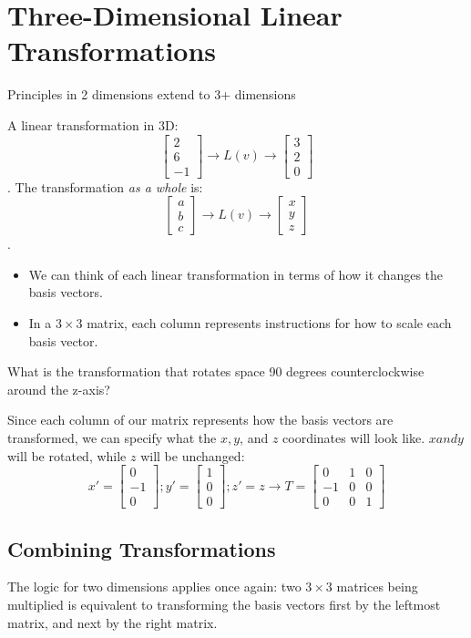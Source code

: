 \section{Three-Dimensional Linear Transformations}
Principles in 2 dimensions extend to 3+ dimensions
\begin{example}
    A linear transformation in 3D:
    $$ \begin{bmatrix}
    2 \\
    6 \\
    -1
    \end{bmatrix} \rightarrow
    L(v) \rightarrow
    \begin{bmatrix}
    3 \\
    2 \\
    0
    \end{bmatrix}$$.
    The transformation \textit{as a whole} is:
    $$ \begin{bmatrix}
        a \\
        b \\
        c
    \end{bmatrix} \rightarrow
    L(v) \rightarrow
    \begin{bmatrix}
        x \\
        y \\
        z
    \end{bmatrix}$$.
\end{example}
\begin{itemize}
    \item We can think of each linear transformation in terms of how it changes the basis vectors.
    \item In a $3 \times 3$ matrix, each column represents instructions for how to scale each basis vector.
\end{itemize}
\begin{example}
    What is the transformation that rotates space 90 degrees counterclockwise around the z-axis?

    Since each column of our matrix represents how the basis vectors are transformed, we can specify what the $x, y$, and $z$ coordinates will look like. $x and y$ will be rotated, while $z$ will be unchanged:
    $$ x' = \begin{bmatrix}
    0 \\
    -1 \\
    0 
    \end{bmatrix};
    y' = \begin{bmatrix}
    1 \\
    0 \\
    0
    \end{bmatrix}; 
    z' = z \rightarrow T = \begin{bmatrix}
    0 & 1 & 0 \\
    -1 & 0 & 0 \\
    0 & 0 & 1
    \end{bmatrix}$$
\end{example}

\subsection{Combining Transformations}
The logic for two dimensions applies once again: two $3 \times 3$ matrices being multiplied is equivalent to transforming the basis vectors first by the
leftmost matrix, and next by the right matrix.